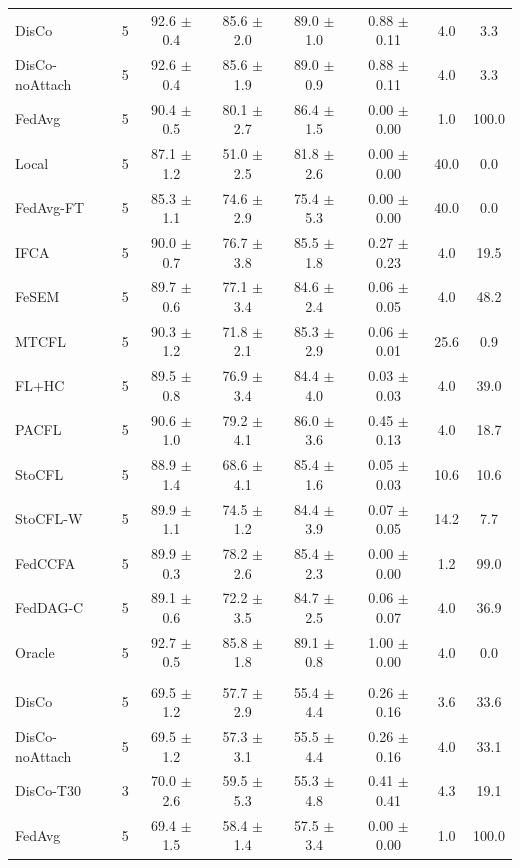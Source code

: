 {{\begin{tabular}{l r c c c c c c}
DisCo & 5 & 92.6 $\pm$ 0.4 & 85.6 $\pm$ 2.0 & 89.0 $\pm$ 1.0 & 0.88 $\pm$ 0.11 & 4.0 & 3.3 \\
DisCo-noAttach & 5 & 92.6 $\pm$ 0.4 & 85.6 $\pm$ 1.9 & 89.0 $\pm$ 0.9 & 0.88 $\pm$ 0.11 & 4.0 & 3.3 \\
FedAvg & 5 & 90.4 $\pm$ 0.5 & 80.1 $\pm$ 2.7 & 86.4 $\pm$ 1.5 & 0.00 $\pm$ 0.00 & 1.0 & 100.0 \\
Local & 5 & 87.1 $\pm$ 1.2 & 51.0 $\pm$ 2.5 & 81.8 $\pm$ 2.6 & 0.00 $\pm$ 0.00 & 40.0 & 0.0 \\
FedAvg-FT & 5 & 85.3 $\pm$ 1.1 & 74.6 $\pm$ 2.9 & 75.4 $\pm$ 5.3 & 0.00 $\pm$ 0.00 & 40.0 & 0.0 \\
IFCA & 5 & 90.0 $\pm$ 0.7 & 76.7 $\pm$ 3.8 & 85.5 $\pm$ 1.8 & 0.27 $\pm$ 0.23 & 4.0 & 19.5 \\
FeSEM & 5 & 89.7 $\pm$ 0.6 & 77.1 $\pm$ 3.4 & 84.6 $\pm$ 2.4 & 0.06 $\pm$ 0.05 & 4.0 & 48.2 \\
MTCFL & 5 & 90.3 $\pm$ 1.2 & 71.8 $\pm$ 2.1 & 85.3 $\pm$ 2.9 & 0.06 $\pm$ 0.01 & 25.6 & 0.9 \\
FL+HC & 5 & 89.5 $\pm$ 0.8 & 76.9 $\pm$ 3.4 & 84.4 $\pm$ 4.0 & 0.03 $\pm$ 0.03 & 4.0 & 39.0 \\
PACFL & 5 & 90.6 $\pm$ 1.0 & 79.2 $\pm$ 4.1 & 86.0 $\pm$ 3.6 & 0.45 $\pm$ 0.13 & 4.0 & 18.7 \\
StoCFL & 5 & 88.9 $\pm$ 1.4 & 68.6 $\pm$ 4.1 & 85.4 $\pm$ 1.6 & 0.05 $\pm$ 0.03 & 10.6 & 10.6 \\
StoCFL-W & 5 & 89.9 $\pm$ 1.1 & 74.5 $\pm$ 1.2 & 84.4 $\pm$ 3.9 & 0.07 $\pm$ 0.05 & 14.2 & 7.7 \\
FedCCFA & 5 & 89.9 $\pm$ 0.3 & 78.2 $\pm$ 2.6 & 85.4 $\pm$ 2.3 & 0.00 $\pm$ 0.00 & 1.2 & 99.0 \\
FedDAG-C & 5 & 89.1 $\pm$ 0.6 & 72.2 $\pm$ 3.5 & 84.7 $\pm$ 2.5 & 0.06 $\pm$ 0.07 & 4.0 & 36.9 \\
Oracle & 5 & 92.7 $\pm$ 0.5 & 85.8 $\pm$ 1.8 & 89.1 $\pm$ 0.8 & 1.00 $\pm$ 0.00 & 4.0 & 0.0 \\
\addlinespace
\multicolumn{8}{l}{\textit{Office-Home}} \\
DisCo & 5 & 69.5 $\pm$ 1.2 & 57.7 $\pm$ 2.9 & 55.4 $\pm$ 4.4 & 0.26 $\pm$ 0.16 & 3.6 & 33.6 \\
DisCo-noAttach & 5 & 69.5 $\pm$ 1.2 & 57.3 $\pm$ 3.1 & 55.5 $\pm$ 4.4 & 0.26 $\pm$ 0.16 & 4.0 & 33.1 \\
DisCo-T30 & 3 & 70.0 $\pm$ 2.6 & 59.5 $\pm$ 5.3 & 55.3 $\pm$ 4.8 & 0.41 $\pm$ 0.41 & 4.3 & 19.1 \\
FedAvg & 5 & 69.4 $\pm$ 1.5 & 58.4 $\pm$ 1.4 & 57.5 $\pm$ 3.4 & 0.00 $\pm$ 0.00 & 1.0 & 100.0 \\

\end{tabular}}}
